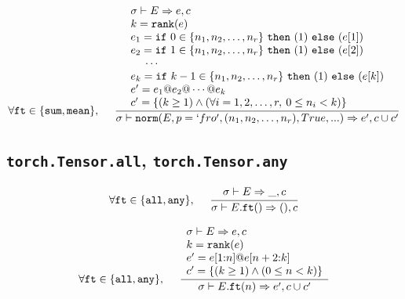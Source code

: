 \documentclass{article}
\begin{document}
\begin{align*}
  \forall \mathtt{ft} \in \{\mathtt{sum}, \mathtt{mean}\},
  \,\,\,\,\,\,\,\,
  \frac
  {
    \begin{array}{l}
      \sigma \vdash E \Rightarrow e, c \\
      k = \mathtt{rank(}e\mathtt{)} \\
      e_1 = \mathtt{if}\,\,0 \in \{n_1, n_2, \dots, n_r\}\,\,\mathtt{then}\,\,(1)\,\,\mathtt{else}\,\,(e[1]) \\
      e_2 = \mathtt{if}\,\,1 \in \{n_1, n_2, \dots, n_r\}\,\,\mathtt{then}\,\,(1)\,\,\mathtt{else}\,\,(e[2]) \\
      \,\,\,\,\,\,\,\, \cdots \\
      e_k = \mathtt{if}\,\,k-1 \in \{n_1, n_2, \dots, n_r\}\,\,\mathtt{then}\,\,(1)\,\,\mathtt{else}\,\,(e[k]) \\
      e' = e_1 \mathtt{@} e_2 \mathtt{@} \cdots \mathtt{@} e_k \\
      c' = \{ (k \geq 1) \land (\forall i=1, 2, \dots, r,\: 0 \leq n_i < k) \}
    \end{array}
  }
  {
    \sigma \vdash \mathtt{norm(}E, p=`fro', (n_1, n_2, \dots, n_r), True, ...\mathtt{)}
      \Rightarrow e', c \cup c'
  }
\end{align*}

\subsection*{\texttt{torch.Tensor.all}, \texttt{torch.Tensor.any}}
\begin{align*}
  \forall \mathtt{ft} \in \{ \mathtt{all}, \mathtt{any} \},\,\,\,\,\,\,\,\,
  \frac
  {
    \begin{array}{l}
      \sigma \vdash E \Rightarrow \_, c
    \end{array}
  }
  {
    \sigma \vdash E.\mathtt{ft(}\mathtt{)} \Rightarrow (), c
  }
\end{align*}

\begin{align*}
  \forall \mathtt{ft} \in \{ \mathtt{all}, \mathtt{any} \},\,\,\,\,\,\,\,\,
  \frac
  {
    \begin{array}{l}
      \sigma \vdash E \Rightarrow e, c \\
      k = \mathtt{rank(}e\mathtt{)} \\
      e' = e \mathtt{[}1\mathtt{:}n\mathtt{]} \mathtt{@} e \mathtt{[}n+2\mathtt{:}k\mathtt{]} \\
      c' = \{ (k \geq 1) \land (0 \leq n < k) \}
    \end{array}
  }
  {
    \sigma \vdash E.\mathtt{ft(}n\mathtt{)} \Rightarrow e', c \cup c'
  }
\end{align*}
\end{document}
